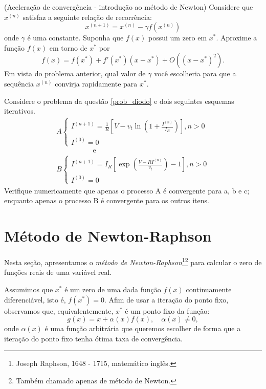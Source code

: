 \begin{exer}(Aceleração de convergência - introdução ao método de Newton)\label{int_new2} Considere que $x^{(n)}$ satisfaz a seguinte relação de recorrência:
$$x^{(n+1)}=x^{(n)} - \gamma f(x^{(n)})$$
onde $\gamma$ é uma constante. Suponha que $f(x)$ possui um zero em $x^*$. Aproxime a função $f(x)$ em torno de $x^*$ por
$$f(x)=f(x^*)+f'(x^*)(x-x^*)+O\left((x-x^*)^2\right).$$
Em vista do problema anterior, qual valor de $\gamma$ você escolheria para que a sequência $x^{(n)}$ convirja rapidamente para $x^*$. 
\end{exer}

\begin{exer} Considere o problema da questão \ref{prob_diodo} e dois seguintes esquemas iterativos.
$$\begin{array}{l}
A\left\{
\begin{array}{ll}
I^{(n+1)}=\frac{1}{R}\left[V-v_t\ln\left(1+\frac{I^{(n)}}{I_R}\right)\right],n>0\\
I^{(0)}=0
\end{array}\right.\\ \hspace{2cm} \text{ e }\\
B\left\{
\begin{array}{ll}
I^{(n+1)}=I_R\left[\exp\left(\frac{V-RI^{(n)}}{v_t}\right)-1\right],n>0\\
I^{(0)}=0
\end{array}\right.
\end{array}
$$
Verifique numericamente que apenas o processo A é convergente para a, b e c; enquanto apenas o processo B é convergente para os outros itens.
\end{exer}

\section{Método de Newton-Raphson}\label{metodo_newton_1d}

Nesta seção, apresentamos o \emph{método de Newton-Raphson}\footnote{Joseph Raphson, 1648 - 1715, matemático inglês.}\footnote{Também chamado apenas de método de Newton.} para calcular o zero de funções reais de uma variável real. 

Assumimos que $x^*$ é um zero de uma dada função $f(x)$ continuamente diferenciável, isto é, $f(x^*) = 0$. Afim de usar a iteração do ponto fixo, observamos que, equivalentemente, $x^*$ é um ponto fixo da função:
\begin{equation*}
  g(x)= x + \alpha(x)f(x),\quad\alpha(x)\neq 0,
\end{equation*}
onde $\alpha(x)$ é uma função arbitrária que queremos escolher de forma que a iteração do ponto fixo tenha ótima taxa de convergência. 

